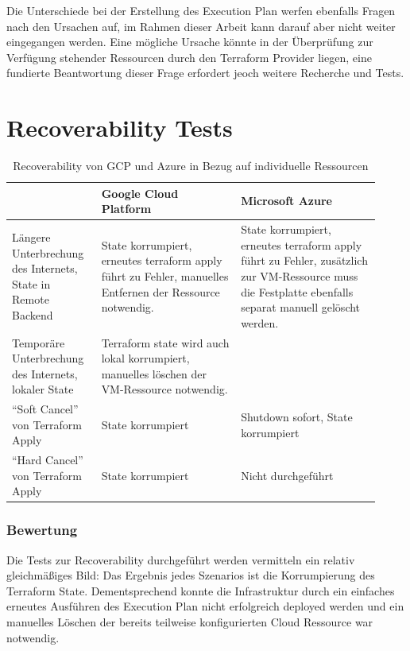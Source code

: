 \begin{spacing}{1.2}
Die Unterschiede bei der Erstellung des Execution Plan werfen ebenfalls
Fragen nach den Ursachen auf, im Rahmen dieser Arbeit kann darauf
aber nicht weiter eingegangen werden. Eine mögliche Ursache
könnte in der Überprüfung zur Verfügung stehender Ressourcen
durch den Terraform Provider liegen,
eine fundierte Beantwortung dieser Frage erfordert jeoch weitere
Recherche und Tests.

\section{Recoverability Tests}

\begin{table}[H]
  \centering
  \begin{tabular}{|p{0.22\linewidth}|p{0.35\linewidth}|p{0.35\linewidth}|}
    \hline
    & Google Cloud Platform & Microsoft Azure\\
    \hline
    Längere Unterbrechung des Internets, State in Remote Backend 
    &State korrumpiert, erneutes terraform apply führt zu Fehler, manuelles Entfernen der Ressource notwendig.
    &State korrumpiert, erneutes terraform apply führt zu Fehler, zusätzlich zur VM-Ressource muss die Festplatte
    ebenfalls separat manuell gelöscht werden.\\
    \hline
    Temporäre Unterbrechung des Internets, lokaler State
    &Terraform state wird auch lokal korrumpiert, manuelles löschen der
    VM-Ressource notwendig.
    &\\
    \hline
    \enquote{Soft Cancel} von Terraform Apply &
    State korrumpiert&
    Shutdown sofort, State korrumpiert\\
    \hline
    \enquote{Hard Cancel} von Terraform Apply &
    State korrumpiert&
    Nicht durchgeführt\\
    \hline
  \end{tabular}
  \caption{Recoverability von GCP und Azure in Bezug auf individuelle Ressourcen}
\end{table}

\subsubsection{Bewertung}

Die Tests zur Recoverability durchgeführt werden vermitteln ein relativ
gleichmäßiges Bild: Das Ergebnis jedes Szenarios ist die Korrumpierung
des Terraform State. Dementsprechend konnte die Infrastruktur durch
ein einfaches erneutes Ausführen des Execution Plan nicht erfolgreich
deployed werden und ein manuelles Löschen der bereits teilweise
konfigurierten Cloud Ressource war notwendig.


\end{spacing}
